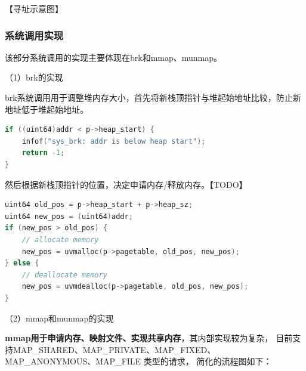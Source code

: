 \documentclass[UTF8,a4paper,10pt]{ctexart}
\begin{document}
【寻址示意图】

\subsubsection{系统调用实现}

该部分系统调用的实现主要体现在brk和mmap、munmap。

（1）brk的实现

brk系统调用用于调整堆内存大小，首先将新栈顶指针与堆起始地址比较，防止新地址低于堆起始地址。

\begin{lstlisting}[title=检查brk参数,frame=trbl,language={C}]
if ((uint64)addr < p->heap_start) {
    infof("sys_brk: addr is below heap start");
    return -1;
}
\end{lstlisting}

然后根据新栈顶指针的位置，决定申请内存/释放内存。【TODO】

\begin{lstlisting}[title=brk实现,frame=trbl,language={C}]
uint64 old_pos = p->heap_start + p->heap_sz;
uint64 new_pos = (uint64)addr;
if (new_pos > old_pos) {
    // allocate memory
    new_pos = uvmalloc(p->pagetable, old_pos, new_pos);
} else {
    // deallocate memory
    new_pos = uvmdealloc(p->pagetable, old_pos, new_pos);
}
\end{lstlisting}

（2）mmap和munmap的实现

\textbf{mmap用于申请内存、映射文件、实现共享内存}，其内部实现较为复杂，
目前支持MAP\_SHARED、MAP\_PRIVATE、MAP\_FIXED、MAP\_ANONYMOUS、MAP\_FILE 类型的请求，
简化的流程图如下：
\end{document}
